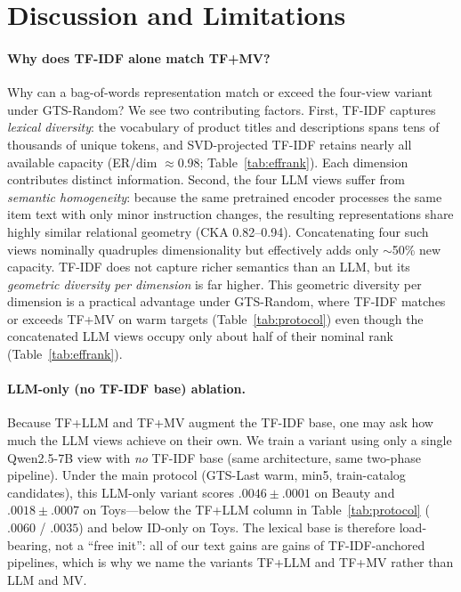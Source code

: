 \documentclass[sigconf,natbib=true,anonymous]{acmart}
\newcommand{\tfidf}{\textsc{TF-IDF}\xspace}
\newcommand{\tfllm}{\textsc{TF+LLM}\xspace}
\newcommand{\tfmv}{\textsc{TF+MV}\xspace}
\begin{document}
\section{Discussion and Limitations}
\label{sec:discussion}

\paragraph{Why does TF-IDF alone match \tfmv?}
Why can a bag-of-words representation match or exceed the four-view variant under GTS-Random?
We see two contributing factors.
First, \tfidf captures \emph{lexical diversity}: the vocabulary of product titles and descriptions spans tens of thousands of unique tokens, and SVD-projected TF-IDF retains nearly all available capacity (ER/dim $\approx$0.98; Table~\ref{tab:effrank}).
Each dimension contributes distinct information.
Second, the four LLM views suffer from \emph{semantic homogeneity}: because the same pretrained encoder processes the same item text with only minor instruction changes, the resulting representations share highly similar relational geometry (CKA 0.82--0.94).
Concatenating four such views nominally quadruples dimensionality but effectively adds only $\sim$50\% new capacity.
TF-IDF does not capture richer semantics than an LLM, but its \emph{geometric diversity per dimension} is far higher.
This geometric diversity per dimension is a practical advantage under GTS-Random, where \tfidf matches or exceeds \tfmv on warm targets (Table~\ref{tab:protocol}) even though the concatenated LLM views occupy only about half of their nominal rank (Table~\ref{tab:effrank}).

\paragraph{LLM-only (no \tfidf base) ablation.}
Because \tfllm and \tfmv augment the \tfidf base, one may ask how much the LLM views achieve on their own.
We train a variant using only a single Qwen2.5-7B view with \emph{no} \tfidf base (same architecture, same two-phase pipeline).
Under the main protocol (GTS-Last warm, min5, train-catalog candidates), this LLM-only variant scores $.0046\pm.0001$ on Beauty and $.0018\pm.0007$ on Toys---below the \tfllm column in Table~\ref{tab:protocol} ($.0060$ / $.0035$) and below ID-only on Toys.
The lexical base is therefore load-bearing, not a ``free init'': all of our text gains are gains of \tfidf-anchored pipelines, which is why we name the variants \tfllm and \tfmv rather than LLM and MV.
\end{document}
